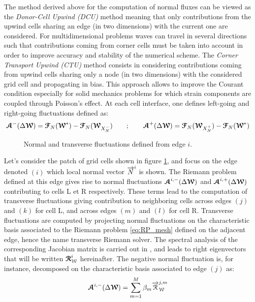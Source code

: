 The method derived above for the computation of normal fluxes can be viewed as the \textit{Donor-Cell Upwind (DCU)} method \cite{Leveque} meaning that only contributions from the upwind cells sharing an edge (in two dimensions) with the current one are considered. For multidimensional problems waves can travel in several directions such that contributions coming from corner cells must be taken into account in order to improve accuracy and stability of the numerical scheme. The \textit{Corner Transport Upwind (CTU)} method \cite{Colella_CTU} consists in considering contributions coming from upwind cells sharing only a node (in two dimensions) with the considered grid cell and propagating in bias. This approach allows to improve the Courant condition especially for solid mechanics problems for which strain components are coupled through Poisson's effect. At each cell interface, one defines left-going and right-going fluctuations defined as:
\begin{equation}
  {\boldsymbol{\mathcal{A}}}^-(\Delta {\boldsymbol{\mathcal{W}}}) = {\boldsymbol{\mathcal{F}}}_N({\boldsymbol{\mathcal{W}}}^*) - {\boldsymbol{\mathcal{F}}}_N({\boldsymbol{\mathcal{W}}}_{X_N^-}) \qquad ;  \qquad {\boldsymbol{\mathcal{A}}}^+(\Delta {\boldsymbol{\mathcal{W}}}) = {\boldsymbol{\mathcal{F}}}_N({\boldsymbol{\mathcal{W}}}_{X_N^+})-{\boldsymbol{\mathcal{F}}}_N({\boldsymbol{\mathcal{W}}}^*) 
\end{equation}
\begin{figure}[h!]
  \centering
  
  \caption{Normal and transverse fluctuations defined from edge $i$.}
  \label{fig:CTU}
\end{figure}
Let's consider the patch of grid cells shown in figure \ref{fig:CTU}, and focus on the edge denoted $(i)$ which local normal vector ${\overrightarrow{N}}^i$ is shown. The Riemann problem defined at this edge gives rise to normal fluctuations ${\boldsymbol{\mathcal{A}}}^{i,-}(\Delta {\boldsymbol{\mathcal{W}}})$ and ${\boldsymbol{\mathcal{A}}}^{i,+}(\Delta {\boldsymbol{\mathcal{W}}})$ contributing to cells L et R respectively. These terms lead to the computation of transverse fluctuations giving contribution to neighboring cells across edges $(j)$ and $(k)$ for cell L, and across edges $(m)$ and $(l)$ for cell R. Transverse fluctuations are computed by projecting normal fluctuations on the characteristic basis associated to the Riemann problem \eqref{eq:RP_mesh} defined on the adjacent edge, hence the name transverse Riemann solver. The spectral analysis of the corresponding Jacobian matrix is carried out in \cite{Kluth}, and leads to right eigenvectors that will be written ${\boldsymbol{\mathcal{R}}}_{\mathcal{W}}^i$ hereinafter. The negative normal fluctuation is, for instance, decomposed on the characteristic basis associated to edge $(j)$ as:
\begin{equation}
{\boldsymbol{\mathcal{A}}}^{i,-}(\Delta {\boldsymbol{\mathcal{W}}}) = \sum_{m=1}^{M} \beta_m {\overrightarrow{\mathcal{R}}}^{j,m}_{\mathcal{W}}
\end{equation}
